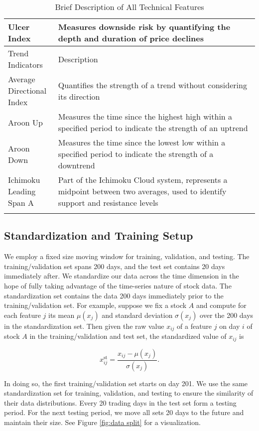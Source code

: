 \documentclass[preprint,12pt,numafflabel,authoryear]{elsarticle}
\begin{document}
\begin{longtable}{ P{0.2\linewidth} P{0.8\linewidth}}
Ulcer Index & Measures downside risk by quantifying the depth and duration of price declines \\
\toprule
Trend Indicators & Description \\
\hline
Average Directional Index & Quantifies the strength of a trend without considering its direction \\
Aroon Up & Measures the time since the highest high within a specified period to indicate the strength of an uptrend \\
Aroon Down & Measures the time since the lowest low within a specified period to indicate the strength of a downtrend \\
Ichimoku Leading Span A & Part of the Ichimoku Cloud system, represents a midpoint between two averages, used to identify support and resistance levels\\
\bottomrule
\caption{Brief Description of All Technical Features}
\label{tab:all features}
\end{longtable}

\subsection{Standardization and Training Setup}
\label{sec:Standardization}
We employ a fixed size moving window for training, validation, and testing. The training/validation set spans 200 days, and the test set contains 20 days immediately after. We standardize our data across the time dimension in the hope of fully taking advantage of the time-series nature of stock data. The standardization set contains the data 200 days immediately prior to the training/validation set. For example, suppose we fix a stock $A$ and compute for each feature $j$ its mean $\mu(x_j)$ and standard deviation $\sigma(x_j)$ over the 200 days in the standardization set. Then given the raw value $x_{ij}$ of a feature $j$ on day $i$ of stock $A$ in the training/validation and test set, the standardized value of $x_{ij}$ is

\begin{equation}
\label{eq:standardization}
\displaystyle
x_{ij}^{\text{st}} = \frac{x_{ij} - \mu(x_j)}{\sigma(x_j)}.
\end{equation}

In doing so, the first training/validation set starts on day 201. We use the same standardization set for training, validation, and testing to ensure the similarity of their data distributions. Every 20 trading days in the test set form a testing period. For the next testing period, we move all sets 20 days to the future and maintain their size. See Figure \ref{fig:data split} for a visualization.
\end{document}
